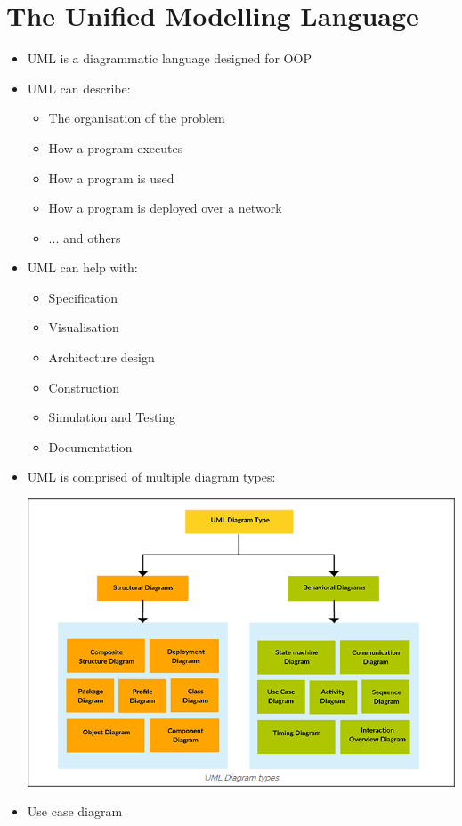 \documentclass{article}[18pt]
\begin{document}
\section{The Unified Modelling Language}
\begin{itemize}
	\item UML is a diagrammatic language designed for OOP
	\item UML can describe:
	\begin{itemize}
		\item The organisation of the problem
		\item How a program executes
		\item How a program is used
		\item How a program is deployed over a network
		\item ... and others
	\end{itemize}
	\item UML can help with:
	\begin{itemize}
		\item Specification
		\item Visualisation
		\item Architecture design
		\item Construction
		\item Simulation and Testing
		\item Documentation
	\end{itemize}
	\item UML is comprised of multiple diagram types:
	\begin{center}
		\includegraphics[scale=0.7]{UML}
	\end{center}
	\item Use case diagram

\end{itemize}
\end{document}
